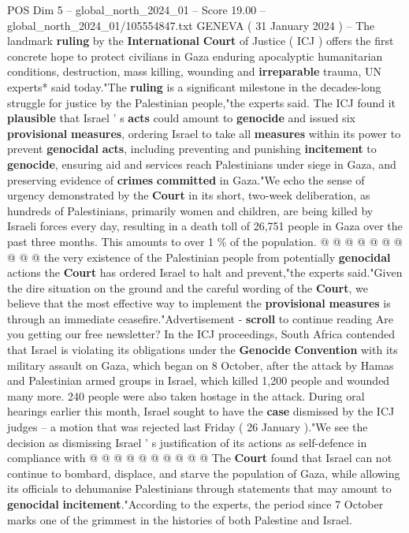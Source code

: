 \begin{textsample}{POS Dim 5 – global\_north\_2024\_01 – Score 19.00 – global\_north\_2024\_01/105554847.txt}  \label{ex:f5_pos_136}
GENEVA ( 31 January 2024 ) -- The landmark \textbf{ruling} by the \textbf{International} \textbf{Court} of Justice ( ICJ ) offers the first concrete hope to protect civilians in Gaza enduring apocalyptic humanitarian conditions, destruction, mass killing, wounding and \textbf{irreparable} trauma, UN experts* said today."The \textbf{ruling} is a significant milestone in the decades-long struggle for justice by the Palestinian people,"the experts said.
The ICJ found it \textbf{plausible} that Israel ' s \textbf{acts} could amount to \textbf{genocide} and issued six \textbf{provisional} \textbf{measures}, ordering Israel to take all \textbf{measures} within its power to prevent \textbf{genocidal} \textbf{acts}, including preventing and punishing \textbf{incitement} to \textbf{genocide}, ensuring aid and services reach Palestinians under siege in Gaza, and preserving evidence of \textbf{crimes} \textbf{committed} in Gaza."We echo the sense of urgency demonstrated by the \textbf{Court} in its short, two-week deliberation, as hundreds of Palestinians, primarily women and children, are being killed by Israeli forces every day, resulting in a death toll of 26,751 people in Gaza over the past three months.
This amounts to over 1 \% of the population. @ @ @ @ @ @ @ @ @ @ the very existence of the Palestinian people from potentially \textbf{genocidal} actions the \textbf{Court} has ordered Israel to halt and prevent,"the experts said."Given the dire situation on the ground and the careful wording of the \textbf{Court}, we believe that the most effective way to implement the \textbf{provisional} \textbf{measures} is through an immediate ceasefire."Advertisement - \textbf{scroll} to continue reading Are you getting our free newsletter?
In the ICJ proceedings, South Africa contended that Israel is violating its obligations under the \textbf{Genocide} \textbf{Convention} with its military assault on Gaza, which began on 8 October, after the attack by Hamas and Palestinian armed groups in Israel, which killed 1,200 people and wounded many more. 240 people were also taken hostage in the attack.
During oral hearings earlier this month, Israel sought to have the \textbf{case} dismissed by the ICJ judges -- a motion that was rejected last Friday ( 26 January )."We see the decision as dismissing Israel ' s justification of its actions as self-defence in compliance with @ @ @ @ @ @ @ @ @ @ The \textbf{Court} found that Israel can not continue to bombard, displace, and starve the population of Gaza, while allowing its officials to dehumanise Palestinians through statements that may amount to \textbf{genocidal} \textbf{incitement}."According to the experts, the period since 7 October marks one of the grimmest in the histories of both Palestine and Israel.

\end{textsample}
